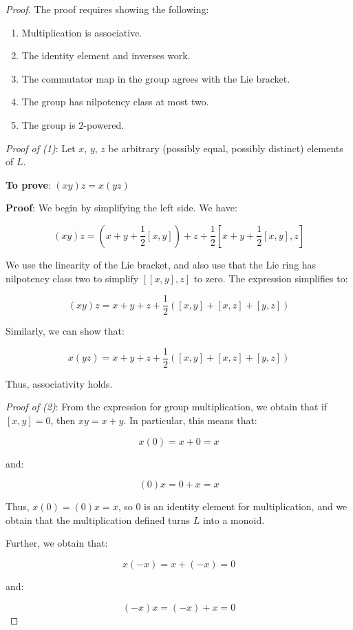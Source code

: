 \begin{proof}
  The proof requires showing the following:

  \begin{enumerate}
  \item Multiplication is associative.
  \item The identity element and inverses work.
  \item The commutator map in the group agrees with the Lie bracket.
  \item The group has nilpotency class at most two.
  \item The group is $2$-powered.
  \end{enumerate}

  {\em Proof of (1)}: Let $x$, $y$, $z$ be arbitrary (possibly equal,
  possibly distinct) elements of $L$.

  {\bf To prove}: $(xy)z = x(yz)$

  {\bf Proof}: We begin by simplifying the left side. We have:

  $$(xy)z = \left(x + y + \frac{1}{2}[x,y]\right) + z + \frac{1}{2}\left[x + y + \frac{1}{2}[x,y],z\right]$$

  We use the linearity of the Lie bracket, and also use that the
  Lie ring has nilpotency class two to simplify $[[x,y],z]$
  to zero. The expression simplifies to:

  $$(xy)z = x + y + z + \frac{1}{2}\left([x,y] + [x,z] + [y,z]\right)$$

  Similarly, we can show that:

  $$x(yz) = x + y + z + \frac{1}{2}\left([x,y] + [x,z] + [y,z]\right)$$

  Thus, associativity holds.

  {\em Proof of (2)}: From the expression for group multiplication, we
  obtain that if $[x,y] = 0$, then $xy = x + y$. In particular, this
  means that:

  $$x(0) = x + 0 = x$$

  and:

  $$(0)x = 0 + x = x$$

  Thus, $x(0) = (0)x = x$, so $0$ is an identity element for
  multiplication, and we obtain that the multiplication defined turns
  $L$ into a monoid.

  Further, we obtain that:

  $$x(-x) = x + (-x) = 0$$

  and:

  $$(-x)x = (-x) + x = 0$$


\end{proof}
